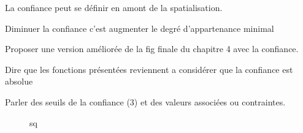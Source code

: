 La confiance peut se définir en amont de la spatialisation.

Diminuer la confiance c'est augmenter le degré d'appartenance minimal

Proposer une version améliorée de la fig finale du chapitre 4 avec la
confiance.

Dire que les fonctions présentées reviennent a considérer que la
confiance est absolue

Parler des seuils de la confiance (3) et des valeurs associées ou
contraintes.


\begin{figure}
  \centering
  
  \caption{sq}
  \label{fig:qs}
\end{figure}




\begin{figure}
  \centering
\end{figure}




